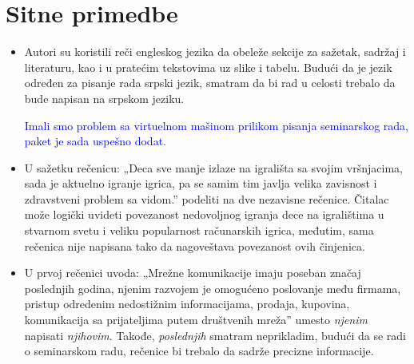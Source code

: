 \documentclass[a4paper]{report}
\newcommand{\odgovor}[1]{\textcolor{blue}{#1}}
\begin{document}
\section{Sitne primedbe}
\begin{itemize}
    \item Autori su koristili reči engleskog jezika da obeleže sekcije za sažetak, sadržaj i literaturu, kao i u pratećim tekstovima uz slike i tabelu. Budući da je jezik određen za pisanje rada srpski jezik, smatram da bi rad u celosti trebalo da bude napisan na srpskom jeziku. 
    
    \odgovor{Imali smo problem sa virtuelnom mašinom prilikom pisanja seminarskog rada, paket je sada uspešno dodat.}
\end{itemize}
\begin{itemize}
    \item U sažetku rečenicu: \newline
    „Deca sve manje izlaze na igrališta sa svojim vršnjacima, sada je aktuelno igranje igrica, pa se samim tim javlja velika zavisnost i zdravstveni problem sa vidom.”\newline
    podeliti na dve nezavisne rečenice. Čitalac može logički uvideti povezanost nedovoljnog igranja dece na igralištima u stvarnom svetu i veliku popularnost računarskih igrica, međutim, sama rečenica nije napisana tako da nagoveštava povezanost ovih činjenica. 
   
    \odgovor{}
\end{itemize}
\begin{itemize}
    \item U prvoj rečenici uvoda:\newline
    „Mrežne komunikacije imaju poseban značaj poslednjih godina, njenim razvojem je omogućeno poslovanje među firmama, pristup odredenim nedostižnim informacijama, prodaja, kupovina, komunikacija sa prijateljima putem društvenih mreža”\newline
    umesto \textit{njenim} napisati \textit{njihovim}. Takođe, \textit{poslednjih} smatram neprikladim, budući da se radi o seminarskom radu, rečenice bi trebalo da sadrže precizne informacije. 
   
    \odgovor{}
\end{itemize}
\end{document}
